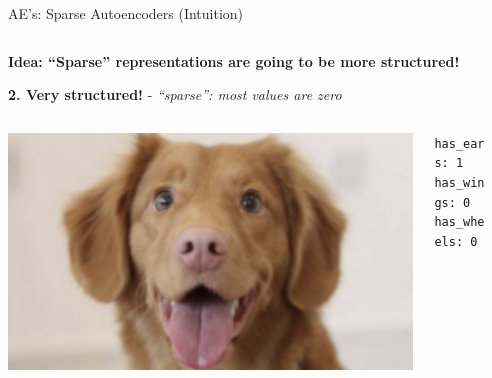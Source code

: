 \documentclass[serif, aspectratio=169]{beamer}
\begin{document}
\begin{frame}{AE’s: Sparse Autoencoders (Intuition)}
\begin{columns}[t]
\begin{column}{0.7\textwidth}
            
        \vspace{0.3cm}

            \textbf{\textcolor{deepred}{Idea: “Sparse” representations are going to be more structured!}}
            
        \vspace{0.6cm}

            \textbf{\textcolor{deepgreen}{2. Very structured!}} - \textit{“sparse”: most values are zero}
            \begin{tcolorbox}[colback=white!10, colframe=white, boxrule=0.5pt, width=0.7\textwidth]
                \begin{columns}[T]
                \hspace{0.5cm}
                    \begin{column}{0.3\textwidth}
                        \includegraphics[width=\textwidth]{pic/SAE dog.png} 
                    \end{column}
                    \begin{column}{0.75\textwidth}
                        \scriptsize{\texttt{has\_ears: 1 \\
                        has\_wings: 0 \\
                        has\_wheels: 0}} \\
                    \end{column}
                \end{columns}
            \end{tcolorbox}
            
 
        \end{column}
        
        \begin{column}{0.4\textwidth}
        \vspace{-1.3cm}


\end{column}
\end{columns}
\end{frame}
\end{document}
